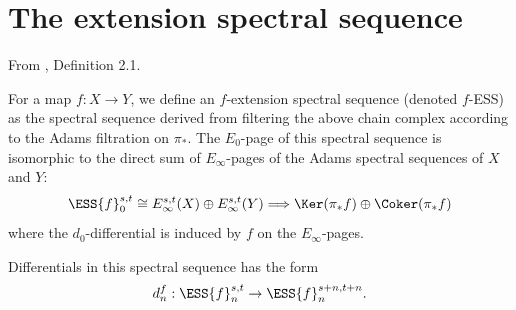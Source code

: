 \section{The extension spectral sequence}

\begin{definition}
\label{paper:2.1}
From \cite{LWX126}, Definition 2.1.\par
\label{def:ess}
  For a map $f: X\to Y$, we define an $f$-extension spectral sequence (denoted $f$-ESS) as the spectral sequence derived from filtering the above chain complex according to the Adams filtration on $\pi_*$. The $E_0$-page of this spectral sequence is isomorphic to the direct sum of $E_\infty$-pages of the Adams spectral sequences of $X$ and $Y$: 
  $$\ESS{f}_0^{s,t} \cong E_\infty^{s,t}(X) \oplus E_\infty^{s,t}(Y) \Longrightarrow \Ker(\pi_*f)\oplus \Coker(\pi_*f)$$
  where the $d_0$-differential is induced by $f$ on the $E_\infty$-pages.
  
  Differentials in this spectral sequence has the form
  $$d_n^{f}: \ESS{f}_n^{s,t}\to \ESS{f}_n^{s+n, t+n}.$$




\sketch
\end{definition}
